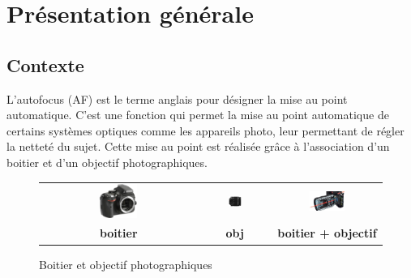 
\section{Présentation générale}

\subsection{Contexte}\label{contexte}

\ifprof
\else

L'autofocus (AF) est le terme anglais pour désigner la mise au point automatique. C'est une fonction qui permet la mise au point automatique 
de certains systèmes optiques comme les appareils photo, leur permettant de régler la netteté du sujet. Cette mise au point est réalisée grâce à
l'association d'un boitier et d'un objectif photographiques.

\begin{figure}[!htb]
\begin{center}
\begin{tabular}{ccc}
\includegraphics[width=0.25\textwidth]{images/image6.jpeg}
&
\includegraphics[width=0.21\textwidth]{images/image7.png}
&
\includegraphics[width=0.35\textwidth]{images/image8.png}
\\
\textbf{boitier}& \textbf{obj}& \textbf{boitier + objectif}
\end{tabular}
\caption{Boitier et objectif photographiques \label{fig1}}
\end{center}
\end{figure}
\vspace{-.5cm}


